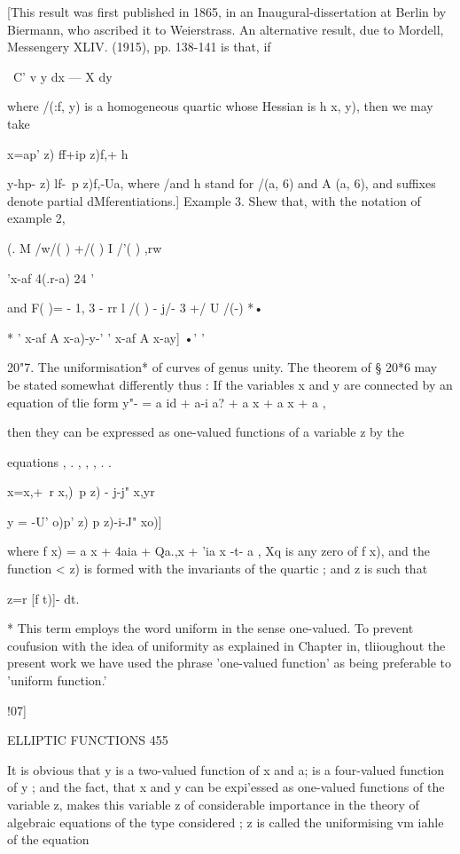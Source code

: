 {[This result was first published in 1865, in an Inaugural-dissertation
at Berlin by Biermann, who ascribed it to Weierstrass. An alternative
result, due to Mordell, Messengery XLIV. (1915), pp. 138-141 is that,
if

\ C' v y dx — X dy

where /(:f, y) is a homogeneous quartic whose Hessian is h x, y), then
we may take

x=ap' z) ff+ip z)f,+ h

y-hp- z) lf-\ p z)f,-Ua, where /and h stand for /(a, 6) and A (a, 6),
and suffixes denote partial dMferentiations.] Example 3. Shew that,
with the notation of example 2,

(. M /w/( ) +/( ) I /'( ) ,rw

 'x-af 4(.r-a) 24 '

and F( )= - 1, 3 - rr l /( ) - j/- 3 +/ U /(-) *•

* ' x-af A x-a)-y-' ' x-af A x-ay] •' '

20"7. The uniformisation* of curves of genus unity. The theorem of §
20*6 may be stated somewhat differently thus : If the variables x and
y are connected by an equation of tlie form y"- = a id + a-i a? + a x
+ a x + a ,

then they can be expressed as one-valued functions of a variable z by
the

equations , . , , , . .

  x=x,+\ r x,)\ p z) - j-j" x,yr

y = -U' o)p' z) p z)-i-J" xo)]

where f x) = a x + 4aia + Qa.,x + 'ia x -t- a , Xq is any zero of f
x), and the function < z) is formed with the invariants of the quartic
; and z is such that

z=r [f t)]- dt.

* This term employs the word uniform in the sense one-valued. To
prevent coufusion with the idea of uniformity as explained in Chapter
in, tliioughout the present work we have used the phrase 'one-valued
function' as being preferable to 'uniform function.'



!07]



ELLIPTIC FUNCTIONS 455



It is obvious that y is a two-valued function of x and a; is a
four-valued function of y ; and the fact, that x and y can be
expi'essed as one-valued functions of the variable z, makes this
variable z of considerable importance in the theory of algebraic
equations of the type considered ; z is called the uniformising vm
iahle of the equation

}

